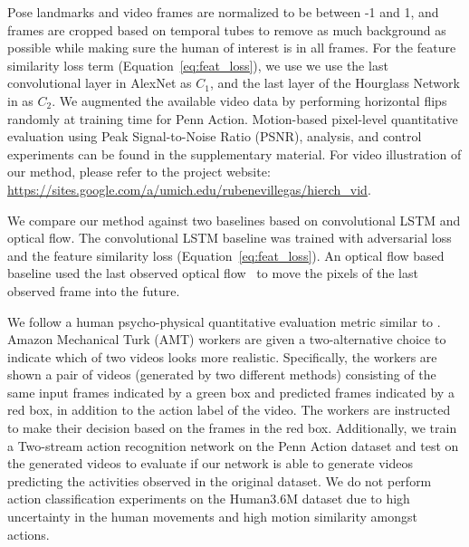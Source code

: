\documentclass{article}
\begin{document}
Pose landmarks and video frames are normalized to be between -1 and 1, and frames are cropped based on temporal tubes to remove as much background as possible while making sure the human of interest is in all frames.
For the feature similarity loss term (Equation~\ref{eq:feat_loss}), we use we use the last convolutional layer in AlexNet \cite{alexnet} as $C_1$, and the last layer of the Hourglass Network in \citet{hourglass} as $C_2$.
We augmented the available video data by performing horizontal flips randomly at training time for Penn Action.
Motion-based pixel-level quantitative evaluation using Peak Signal-to-Noise Ratio (PSNR), analysis, and control experiments can be found in the supplementary material.
For video illustration of our method, please refer to the project website: \url{https://sites.google.com/a/umich.edu/rubenevillegas/hierch_vid}.

We compare our method against two baselines based on convolutional LSTM and optical flow.
The convolutional LSTM baseline \cite{convlstm} was trained with adversarial loss \cite{Mathieu16} and the feature similarity loss (Equation~\ref{eq:feat_loss}).
An optical flow based baseline used the last observed optical flow~\cite{farneback2003two} to move the pixels of the last observed frame into the future.

We follow a human psycho-physical quantitative evaluation metric similar to \citet{Vondrick16}.
Amazon Mechanical Turk (AMT) workers are given a two-alternative choice to indicate which of two videos looks more realistic.
Specifically, the workers are shown a pair of videos (generated by two different methods) consisting of the same input frames indicated by a green box and predicted frames indicated by a red box, in addition to the action label of the video.
The workers are instructed to make their decision based on the frames in the red box.
Additionally, we train a Two-stream action recognition network \cite{Simonyan14} on the Penn Action dataset and test on the generated videos to evaluate if our network is able to generate videos predicting the activities observed in the original dataset.
We do not perform action classification experiments on the Human3.6M dataset due to high uncertainty in the human movements and high motion similarity amongst actions.
\end{document}

